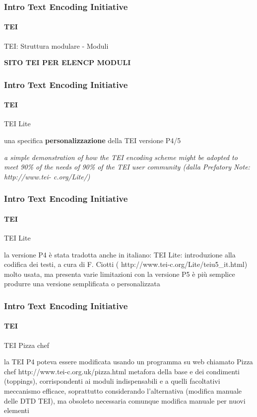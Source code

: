 \begin{frame}
	\frametitle{Intro Text Encoding Initiative}
	\framesubtitle{TEI}
	\addtocounter{nframe}{1}

	\begin{block}{TEI: Struttura modulare - Moduli}

		\textbf{SITO TEI PER ELENCP MODULI}

	\end{block}

\end{frame}


\begin{frame}
	\frametitle{Intro Text Encoding Initiative}
	\framesubtitle{TEI}
	\addtocounter{nframe}{1}

	\begin{block}{TEI Lite}

		una specifica \textbf{personalizzazione} della TEI versione P4/5

	\end{block}

	\textit{a simple demonstration of how the TEI encoding scheme
		might be adopted to meet 90\% of the needs of 90\% of the
		TEI user community (dalla Prefatory Note: http://www.tei-
		c.org/Lite/)}

\end{frame}


\begin{frame}
	\frametitle{Intro Text Encoding Initiative}
	\framesubtitle{TEI}
	\addtocounter{nframe}{1}

	\begin{block}{TEI Lite}

		la versione P4 è stata tradotta anche in italiano: TEI Lite:
		introduzione alla codifica dei testi, a cura di F. Ciotti (
		http://www.tei-c.org/Lite/teiu5_it.html)
		molto usata, ma presenta varie limitazioni
		con la versione P5 è più semplice produrre una versione
		semplificata o personalizzata

	\end{block}


\end{frame}

\begin{frame}
	\frametitle{Intro Text Encoding Initiative}
	\framesubtitle{TEI}
	\addtocounter{nframe}{1}

	\begin{block}{TEI Pizza chef}

		la TEI P4 poteva essere modificata usando un programma su
		web chiamato Pizza chef
		http://www.tei-c.org.uk/pizza.html
		metafora della base e dei condimenti (toppings),
		corrispondenti ai moduli indispensabili e a quelli facoltativi
		meccanismo efficace, soprattutto considerando l’alternativa
		(modifica manuale delle DTD TEI), ma obsoleto
		necessaria comunque modifica manuale per nuovi elementi

	\end{block}


\end{frame}

